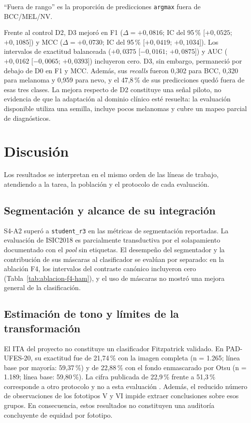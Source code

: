 ``Fuera de rango'' es la proporción de predicciones \texttt{argmax} fuera de BCC/MEL/NV.

Frente al control D2, D3 mejoró en F1 ($\Delta=+0{,}0816$; IC del 95\,\% [$+0{,}0525$; $+0{,}1085$]) y MCC ($\Delta=+0{,}0730$; IC del 95\,\% [$+0{,}0419$; $+0{,}1034$]). Los intervalos de exactitud balanceada ($+0{,}0375$ [$-0{,}0161$; $+0{,}0875$]) y AUC ($+0{,}0162$ [$-0{,}0065$; $+0{,}0393$]) incluyeron cero. D3, sin embargo, permaneció por debajo de D0 en F1 y MCC. Además, sus \textit{recalls} fueron 0,302 para BCC, 0,320 para melanoma y 0,959 para nevo, y el 47,8\,\% de sus predicciones quedó fuera de esas tres clases. La mejora respecto de D2 constituye una señal piloto, no evidencia de que la adaptación al dominio clínico esté resuelta: la evaluación disponible utiliza una semilla, incluye pocos melanomas y cubre un mapeo parcial de diagnósticos.

\section{Discusión}
\label{sec:discusion-integrada}

Los resultados se interpretan en el mismo orden de las líneas de trabajo, atendiendo a la tarea, la población y el protocolo de cada evaluación.

\subsection{Segmentación y alcance de su integración}

S4-A2 superó a \texttt{student\_r3} en las métricas de segmentación reportadas. La evaluación de ISIC2018 es parcialmente transductiva por el solapamiento documentado con el \textit{pool} sin etiquetas. El desempeño del segmentador y la contribución de sus máscaras al clasificador se evalúan por separado: en la ablación F4, los intervalos del contraste canónico incluyeron cero (Tabla~\ref{tab:ablacion-f4-ham}), y el uso de máscaras no mostró una mejora general de la clasificación.

\subsection{Estimación de tono y límites de la transformación}

El ITA del proyecto no constituye un clasificador Fitzpatrick validado. En PAD-UFES-20, su exactitud fue de 21,74\,\% con la imagen completa (n = 1.265; línea base por mayoría: 59,37\,\%) y de 22,88\,\% con el fondo enmascarado por Otsu (n = 1.189; línea base: 59,80\,\%). La cifra publicada de 22,9\,\% frente a 51,3\,\% corresponde a otro protocolo y no a esta evaluación \parencite{alipour2026italimitations}. Además, el reducido número de observaciones de los fototipos V y VI impide extraer conclusiones sobre esos grupos. En consecuencia, estos resultados no constituyen una auditoría concluyente de equidad por fototipo.

